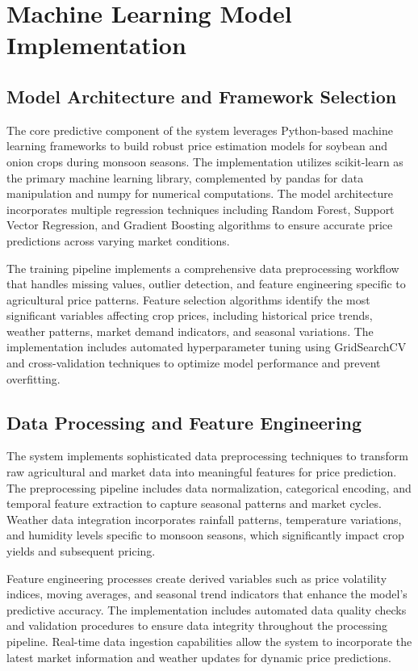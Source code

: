 \section{Machine Learning Model Implementation}

\subsection{Model Architecture and Framework Selection}

The core predictive component of the system leverages Python-based machine learning frameworks to build robust price estimation models for soybean and onion crops during monsoon seasons. The implementation utilizes scikit-learn as the primary machine learning library, complemented by pandas for data manipulation and numpy for numerical computations. The model architecture incorporates multiple regression techniques including Random Forest, Support Vector Regression, and Gradient Boosting algorithms to ensure accurate price predictions across varying market conditions.

The training pipeline implements a comprehensive data preprocessing workflow that handles missing values, outlier detection, and feature engineering specific to agricultural price patterns. Feature selection algorithms identify the most significant variables affecting crop prices, including historical price trends, weather patterns, market demand indicators, and seasonal variations. The implementation includes automated hyperparameter tuning using GridSearchCV and cross-validation techniques to optimize model performance and prevent overfitting.

\subsection{Data Processing and Feature Engineering}

The system implements sophisticated data preprocessing techniques to transform raw agricultural and market data into meaningful features for price prediction. The preprocessing pipeline includes data normalization, categorical encoding, and temporal feature extraction to capture seasonal patterns and market cycles. Weather data integration incorporates rainfall patterns, temperature variations, and humidity levels specific to monsoon seasons, which significantly impact crop yields and subsequent pricing.

Feature engineering processes create derived variables such as price volatility indices, moving averages, and seasonal trend indicators that enhance the model's predictive accuracy. The implementation includes automated data quality checks and validation procedures to ensure data integrity throughout the processing pipeline. Real-time data ingestion capabilities allow the system to incorporate the latest market information and weather updates for dynamic price predictions.

